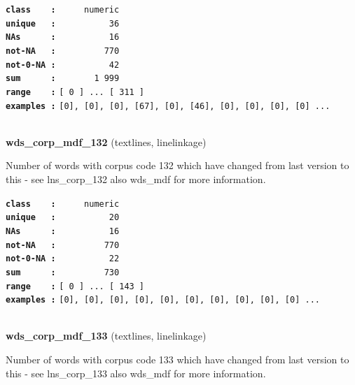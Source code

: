 \documentclass[]{article}
\begin{document}
\textbf{\texttt{class\ \ \ \ :}} \texttt{~~~~~numeric}\\
\textbf{\texttt{unique\ \ \ :}} \texttt{~~~~~~~~~~36}\\
\textbf{\texttt{NAs\ \ \ \ \ \ :}} \texttt{~~~~~~~~~~16}\\
\textbf{\texttt{not-NA\ \ \ :}} \texttt{~~~~~~~~~770}\\
\textbf{\texttt{not-0-NA\ :}} \texttt{~~~~~~~~~~42}\\
\textbf{\texttt{sum\ \ \ \ \ \ :}} \texttt{~~~~~~~1~999}\\
\textbf{\texttt{range\ \ \ \ :}}
\texttt{{[}\ 0\ {]}\ ...\ {[}\ 311\ {]}}\\
\textbf{\texttt{examples\ :}}
\texttt{{[}0{]},\ {[}0{]},\ {[}0{]},\ {[}67{]},\ {[}0{]},\ {[}46{]},\ {[}0{]},\ {[}0{]},\ {[}0{]},\ {[}0{]}\ ...}\\

~

\textbf{wds\_corp\_mdf\_132} (textlines, linelinkage)

Number of words with corpus code 132 which have changed from last
version to this - see lns\_corp\_132 also wds\_mdf for more information.

\textbf{\texttt{class\ \ \ \ :}} \texttt{~~~~~numeric}\\
\textbf{\texttt{unique\ \ \ :}} \texttt{~~~~~~~~~~20}\\
\textbf{\texttt{NAs\ \ \ \ \ \ :}} \texttt{~~~~~~~~~~16}\\
\textbf{\texttt{not-NA\ \ \ :}} \texttt{~~~~~~~~~770}\\
\textbf{\texttt{not-0-NA\ :}} \texttt{~~~~~~~~~~22}\\
\textbf{\texttt{sum\ \ \ \ \ \ :}} \texttt{~~~~~~~~~730}\\
\textbf{\texttt{range\ \ \ \ :}}
\texttt{{[}\ 0\ {]}\ ...\ {[}\ 143\ {]}}\\
\textbf{\texttt{examples\ :}}
\texttt{{[}0{]},\ {[}0{]},\ {[}0{]},\ {[}0{]},\ {[}0{]},\ {[}0{]},\ {[}0{]},\ {[}0{]},\ {[}0{]},\ {[}0{]}\ ...}\\

~

\textbf{wds\_corp\_mdf\_133} (textlines, linelinkage)

Number of words with corpus code 133 which have changed from last
version to this - see lns\_corp\_133 also wds\_mdf for more information.
\end{document}
